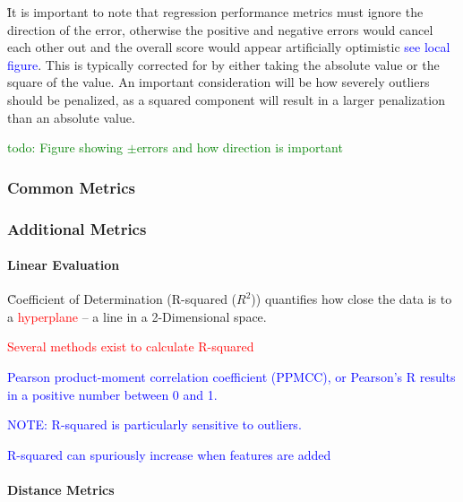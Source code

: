\r{It is important to note that regression performance metrics must ignore the direction of the error, otherwise the positive and negative errors would cancel each other out and the overall score would appear artificially optimistic \textcolor{blue}{see local figure}. This is typically corrected for by either taking the absolute value or the square of the value. An important consideration will be how severely outliers should be penalized, as a squared component will result in a larger penalization than an absolute value.}

\textcolor{green}{todo: Figure showing $\pm$errors and how direction is important}

\subsubsection{Common Metrics}

 



\subsubsection{Additional Metrics}


\paragraph{Linear Evaluation}


\r{Coefficient of Determination (R-squared ($R^2$)) quantifies how close the data is to a \textcolor{red}{hyperplane} -- a line in a 2-Dimensional space.}



\textcolor{red}{Several methods exist to calculate R-squared}

\textcolor{blue}{Pearson product-moment correlation coefficient (PPMCC), or {Pearson's R} results in a positive number between 0 and 1.}

\textcolor{blue}{NOTE: R-squared is particularly sensitive to outliers.}

\textcolor{blue}{R-squared can spuriously increase when features are added}

\paragraph{Distance Metrics}

